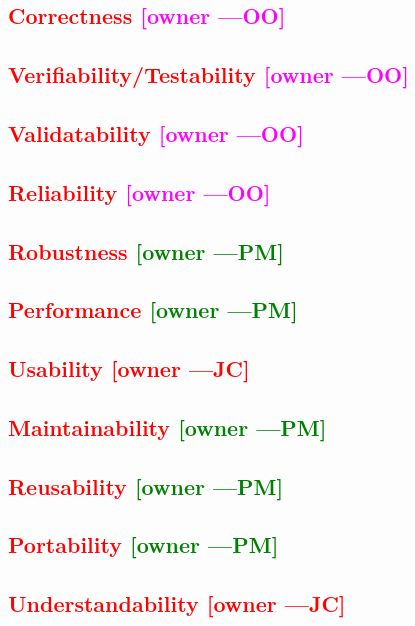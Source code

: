 \documentclass[letterpaper,cleveref]{lipics-v2019}
\newcommand{\authornote}[3]{\textcolor{#1}{[#3 ---#2]}}
\newcommand{\authornote}[3]{}
\newcommand{\jc}[1]{\authornote{red}{JC}{#1}} %
\newcommand{\oo}[1]{\authornote{magenta}{OO}{#1}} %
\newcommand{\pmi}[1]{\authornote{green}{PM}{#1}} %
\newcommand{\notdone}[1]{\textcolor{red}{#1}}
\theoremstyle{definition}
\begin{document}
\subsection{\notdone{Correctness} \oo{owner}}

\subsection{\notdone{Verifiability/Testability} \oo{owner}}

\subsection{\notdone{Validatability} \oo{owner}}

\subsection{\notdone{Reliability} \oo{owner}}

\subsection{\notdone{Robustness} \pmi{owner}}

\subsection{\notdone{Performance} \pmi{owner}}

\subsection{\notdone{Usability} \jc{owner}} 

\subsection{\notdone{Maintainability} \pmi{owner}}

\subsection{\notdone{Reusability} \pmi{owner}}

\subsection{\notdone{Portability} \pmi{owner}}

\subsection{\notdone{Understandability} \jc{owner}}
\end{document}
